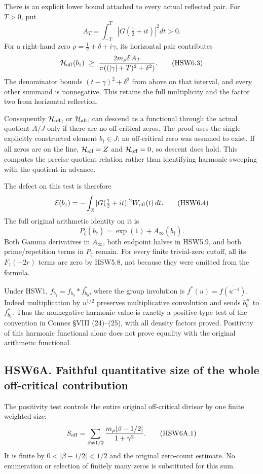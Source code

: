 There is an explicit lower bound attached to every actual reflected
pair. For \(T>0\), put \[
A_T=\int_{-T}^T|G(\tfrac12+it)|^2dt>0.
\] For a right-hand zero \(\rho=\tfrac12+\delta+i\gamma\), its
horizontal pair contributes \[
\mathcal H_{\rm off}(b_\dagger)\ \ge\
\frac{2m_\rho\delta\,A_T}
{\pi((|\gamma|+T)^2+\delta^2)}.
\tag{HSW6.3}
\] The denominator bounds \((t-\gamma)^2+\delta^2\) from above on that
interval, and every other summand is nonnegative. This retains the full
multiplicity and the factor two from horizontal reflection.

Consequently \(\mathcal H_{\rm off}\), or \(\mathcal H_{\rm all}\), can
descend as a functional through the actual quotient \(A/J\) only if
there are no off-critical zeros. The proof uses the single explicitly
constructed element \(b_\dagger\in J\); no off-critical zero was assumed
to exist. If all zeros are on the line, \(\mathcal H_{\rm all}=Z\) and
\(\mathcal H_{\rm off}=0\), so descent does hold. This computes the
precise quotient relation rather than identifying harmonic sweeping with
the quotient in advance.

The defect on this test is therefore \[
\mathcal E(b_\dagger)=
-\int_{\mathbb R}|G(\tfrac12+it)|^2W_{\rm off}(t)\,dt.
\tag{HSW6.4}
\] The full original arithmetic identity on it is \[
P_\zeta(b_\dagger)=\exp(1)+A_\infty(b_\dagger).
\tag{HSW6.5}
\] Both Gamma derivatives in \(A_\infty\), both endpoint halves in
HSW5.9, and both prime/repetition terms in \(P_\zeta\) remain. For every
finite trivial-zero cutoff, all its \(F_\dagger(-2r)\) terms are zero by
HSW5.8, not because they were omitted from the formula.

Under HSW1, \(f_{b_\dagger}=f_{b_0}*f_{b_0}^*\), where the group
involution is \(f^*(u)=\overline{f(u^{-1})}\). Indeed multiplication by
\(u^{1/2}\) preserves multiplicative convolution and sends \(b_0^\#\) to
\(f_{b_0}^*\). Thus the nonnegative harmonic value is exactly a
positive-type test of the convention in Connes §VIII (24)--(25), with
all density factors proved. Positivity of this harmonic functional alone
does not prove equality with the original arithmetic functional.

\subsection{HSW6A. Faithful quantitative size of the whole off-critical
contribution}\label{hsw6a.-faithful-quantitative-size-of-the-whole-off-critical-contribution}

The positivity test controls the entire original off-critical divisor by
one finite weighted size: \[
S_{\rm off}=\sum_{\beta\ne1/2}
 \frac{m_\rho|\beta-1/2|}{1+\gamma^2}.
\tag{HSW6A.1}
\] It is finite by \(0<|\beta-1/2|<1/2\) and the original zero-count
estimate. No enumeration or selection of finitely many zeros is
substituted for this sum.

